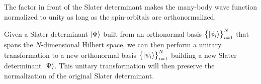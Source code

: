             The factor in front of the Slater determinant makes the many-body wave
            function normalized to unity as long as the spin-orbitals are
            orthonormalized.

            \begin{lemma}
                Given a Slater determinant $\ket{\Phi}$ built from an
                orthonormal basis $\left\{ \ket{\phi_i} \right\}_{i = 1}^{N}$ that spans
                the $N$-dimensional Hilbert space, we can then perform a unitary
                transformation to a new orthonormal basis
                $\left\{ \ket{\psi_i} \right\}_{i = 1}^{N}$ building a new Slater
                determinant $\ket{\Psi}$.
                This unitary transformation will then preserve the normalization
                of the original Slater determinant.
            \end{lemma}

